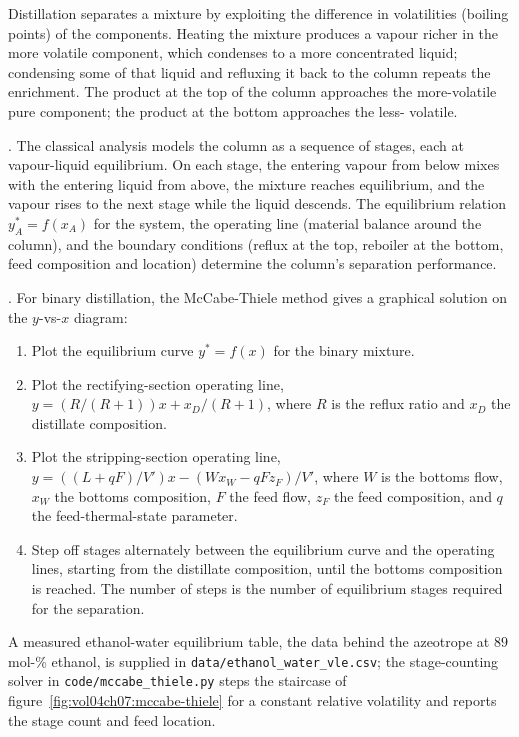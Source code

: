 Distillation separates a mixture by exploiting the difference in
volatilities (boiling points) of the components. Heating the mixture
produces a vapour richer in the more volatile component, which
condenses to a more concentrated liquid; condensing some of that
liquid and refluxing it back to the column repeats the enrichment.
The product at the top of the column approaches the more-volatile
pure component; the product at the bottom approaches the less-
volatile.

. The classical analysis models
the column as a sequence of stages, each at vapour-liquid equilibrium.
On each stage, the entering vapour from below mixes with the entering
liquid from above, the mixture reaches equilibrium, and the vapour
rises to the next stage while the liquid descends. The equilibrium
relation $y_A^* = f(x_A)$ for the system, the operating line
(material balance around the column), and the boundary conditions
(reflux at the top, reboiler at the bottom, feed composition and
location) determine the column's separation performance.

. For binary distillation, the
McCabe-Thiele method gives a graphical solution on the
$y$-vs-$x$ diagram:

\begin{enumerate}[leftmargin=*]
  \item Plot the equilibrium curve $y^* = f(x)$ for the binary mixture.
  \item Plot the rectifying-section operating line, $y = (R/(R+1)) x
    + x_D/(R+1)$, where $R$ is the reflux ratio and $x_D$ the
    distillate composition.
  \item Plot the stripping-section operating line, $y = ((L+qF)/V')
    x - (W x_W - qF z_F)/V'$, where $W$ is the bottoms flow, $x_W$
    the bottoms composition, $F$ the feed flow, $z_F$ the feed
    composition, and $q$ the feed-thermal-state parameter.
  \item Step off stages alternately between the equilibrium curve
    and the operating lines, starting from the distillate composition,
    until the bottoms composition is reached. The number of steps
    is the number of equilibrium stages required for the separation.
\end{enumerate}



A measured ethanol-water equilibrium table, the data behind the
azeotrope at $89$ mol-\% ethanol, is supplied in
\texttt{data/ethanol\_water\_vle.csv}; the stage-counting solver in
\texttt{code/mccabe\_thiele.py} steps the staircase of
figure~\ref{fig:vol04ch07:mccabe-thiele} for a constant relative
volatility and reports the stage count and feed location.

